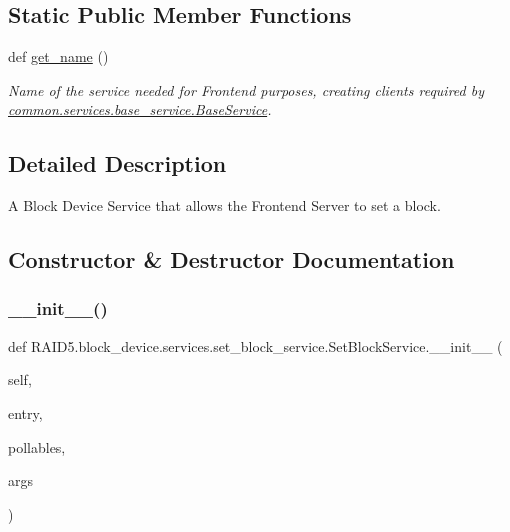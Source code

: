 \subsection*{Static Public Member Functions}
\begin{DoxyCompactItemize}
\item 
def \hyperlink{class_r_a_i_d5_1_1block__device_1_1services_1_1set__block__service_1_1_set_block_service_a8278d215309ac794164fa430a9727cc2}{get\+\_\+name} ()
\begin{DoxyCompactList}\small\item\em Name of the service needed for Frontend purposes, creating clients required by \hyperlink{class_r_a_i_d5_1_1common_1_1services_1_1base__service_1_1_base_service}{common.\+services.\+base\+\_\+service.\+Base\+Service}. \end{DoxyCompactList}\end{DoxyCompactItemize}


\subsection{Detailed Description}
A Block Device Service that allows the Frontend Server to set a block. 

\subsection{Constructor \& Destructor Documentation}
\mbox{\label{class_r_a_i_d5_1_1block__device_1_1services_1_1set__block__service_1_1_set_block_service_a591d47df0e924696ac23450906f5ddf2}} 
\subsubsection{\texorpdfstring{\+\_\+\+\_\+init\+\_\+\+\_\+()}{\_\_init\_\_()}}
{\footnotesize\ttfamily def R\+A\+I\+D5.\+block\+\_\+device.\+services.\+set\+\_\+block\+\_\+service.\+Set\+Block\+Service.\+\_\+\+\_\+init\+\_\+\+\_\+ (\begin{DoxyParamCaption}\item[{}]{self,  }\item[{}]{entry,  }\item[{}]{pollables,  }\item[{}]{args }\end{DoxyParamCaption})}



